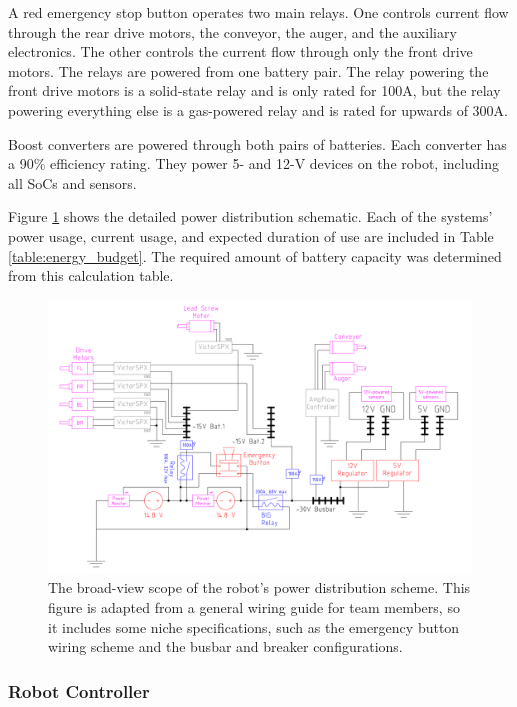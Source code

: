 \documentclass[class=article, crop=false]{standalone}
\begin{document}
	A red emergency stop button operates two main relays. One controls current flow through the rear drive motors, the conveyor, the auger, and the auxiliary electronics. The other controls the current flow through only the front drive motors. The relays are powered from one battery pair. The relay powering the front drive motors is a solid-state relay and is only rated for 100A, but the relay powering everything else is a gas-powered relay and is rated for upwards of 300A. 

	Boost converters are powered through both pairs of batteries. Each converter has a 90\% efficiency rating. They power 5- and 12-V devices on the robot, including all SoCs and sensors.
	
	Figure \ref{fig:power-dist} shows the detailed power distribution schematic. Each of the systems’ power usage, current usage, and expected duration of use are included in Table \ref{table:energy_budget}. The required amount of battery capacity was determined from this calculation table. 
	
	\FloatBarrier
	\begin{figure}[h]
	\centering
	 \includegraphics[width=1\linewidth]{09_Figures/power-distribution.jpg}
	 \caption{The broad-view scope of the robot’s power distribution scheme. This figure is adapted from a general wiring guide for team members, so it includes some niche specifications, such as the emergency button wiring scheme and the busbar and breaker configurations.}
	 \label{fig:power-dist}
	\end{figure}
	\FloatBarrier
	
	
	\subsubsection{Robot Controller}
	
\end{document}
